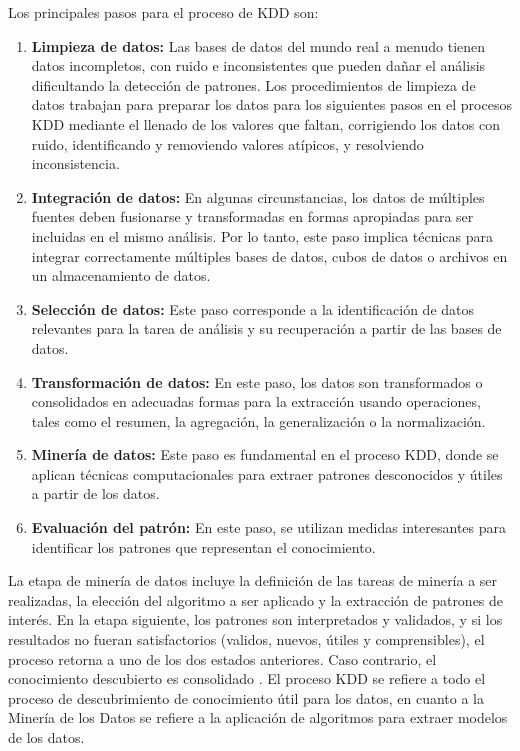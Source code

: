 Los principales pasos para el proceso de KDD son:

\begin{enumerate}

    \item \textbf{Limpieza de datos:} Las bases de datos del mundo real a menudo tienen datos incompletos, con ruido e inconsistentes que pueden dañar el análisis dificultando la detección de patrones. Los procedimientos de limpieza de datos trabajan para preparar los datos para los siguientes pasos en el procesos KDD mediante el llenado de los valores que faltan, corrigiendo los datos con ruido, identificando y removiendo valores atípicos, y resolviendo inconsistencia.
    \item \textbf{Integración de datos:} En algunas circunstancias, los datos de múltiples fuentes deben fusionarse y transformadas en formas apropiadas para ser incluidas en el mismo análisis. Por lo tanto, este paso implica técnicas para integrar correctamente múltiples bases de datos, cubos de datos o archivos en un almacenamiento de datos.
    \item \textbf{Selección de datos:} Este paso corresponde a la identificación de datos relevantes para la tarea de análisis y su recuperación a partir de las bases de datos.
    \item \textbf{Transformación de datos:} En este paso, los datos son transformados o consolidados en adecuadas formas para la extracción usando operaciones, tales como el resumen, la agregación, la generalización o la normalización.
    \item \textbf{Minería de datos:} Este paso es fundamental en el proceso KDD, donde se aplican técnicas computacionales para extraer patrones desconocidos y útiles a partir de los datos.
    \item \textbf{Evaluación del patrón:} En este paso, se utilizan medidas interesantes para identificar los patrones que representan el conocimiento.

\end{enumerate}


La etapa de minería de datos incluye la definición de las tareas de minería a ser realizadas, la elección del algoritmo a ser aplicado y la extracción de patrones de interés. En la etapa siguiente, los patrones son interpretados y validados, y si los resultados no fueran satisfactorios (validos, nuevos, útiles y comprensibles), el proceso retorna a uno de los dos estados anteriores. Caso contrario, el conocimiento descubierto es consolidado \cite{Fayyad:1996:DMK:257938.257942}. El proceso KDD se refiere a todo el proceso de descubrimiento de conocimiento útil para los datos, en cuanto a la Minería de los Datos se refiere a la aplicación de algoritmos para extraer modelos de los datos.

